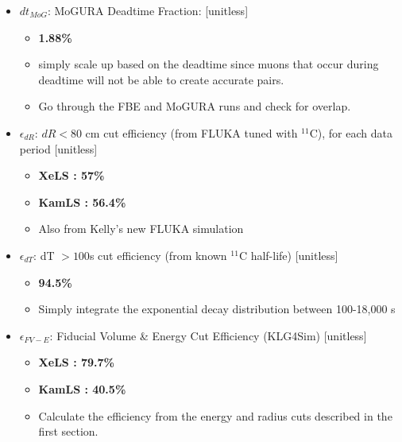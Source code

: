 \documentclass[12pt,letterpaper]{article}
\begin{document}
\begin{itemize}
	\item $dt_{MoG}$: MoGURA Deadtime Fraction: [unitless]
	\begin{itemize}
		\item \textbf{1.88\%}
		\item simply scale up based on the deadtime since muons that occur during deadtime will not be able to create accurate pairs.
		\item Go through the FBE and MoGURA runs and check for overlap.
	\end{itemize}
	\item $\epsilon_{dR}$: $dR<80$ cm cut efficiency (from FLUKA tuned with $^{11}$C), for each data period [unitless]
	\begin{itemize}
		\item \textbf{XeLS : 57\%}
		\item \textbf{KamLS : 56.4\%}
		\item Also from Kelly's new FLUKA simulation
	\end{itemize}
	\item $\epsilon_{dT}$: dT $>100$s cut efficiency (from known $^{11}$C half-life) [unitless]
	\begin{itemize}
		\item \textbf{94.5\%}
		\item Simply integrate the exponential decay distribution between 100-18,000 s
	\end{itemize}
	\item $\epsilon_{FV-E}$: Fiducial Volume \& Energy Cut Efficiency (KLG4Sim) [unitless]
	\begin{itemize}
		\item \textbf{XeLS : 79.7\%}
		\item \textbf{KamLS : 40.5\%}
		\item Calculate the efficiency from the energy and radius cuts described in the first section.
	\end{itemize}
\end{itemize}
\end{document}

